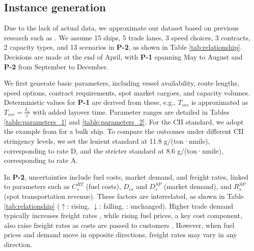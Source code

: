 \documentclass[11pt,english]{article}
\begin{document}
\subsection{Instance generation}
\label{sec:instance}

Due to the lack of actual data, we approximate our dataset based on previous research such as \cite{wang2018planning}. We assume 15 ships, 5 trade lanes, 3 speed choices, 3 contracts, 2 capacity types, and 13 scenarios in \textbf{P-2}, as shown in Table \ref{tab:relationship}. Decisions are made at the end of April, with \textbf{P-1} spanning May to August and \textbf{P-2} from September to December.

We first generate basic parameters, including vessel availability, route lengths, speed options, contract requirements, spot market cargoes, and capacity volumes. Deterministic values for \textbf{P-1} are derived from these, e.g., $T_{vre}$ is approximated as $T_{vre} = \frac{L_r}{e}$ with added layover time. Parameter ranges are detailed in Tables \ref{table:parameters_1} and \ref{table:parameters_2}. For the CII standard, we adopt the example from \cite{IMO_MEPC76_15_Add2_2021} for a bulk ship. To compare the outcomes under different CII stringency levels, we set the lenient standard at 11.8 g/(ton·nmile), corresponding to rate D, and the stricter standard at 8.6 g/(ton·nmile), corresponding to rate A.

In \textbf{P-2}, uncertainties include fuel costs, market demand, and freight rates, linked to parameters such as $C^{RT}_{s}$ (fuel costs), $D_{cs}$ and $D^{SP}_s$ (market demand), and $R^{SP}_s$ (spot transportation revenue). These factors are interrelated, as shown in Table \ref{tab:relationship} ($\uparrow$: rising, $\downarrow$: falling, \textemdash: unchanged). Higher trade demand typically increases freight rates \citep{bai2021tanker,lun2013demand}, while rising fuel prices, a key cost component, also raise freight rates as costs are passed to customers \citep{xu2011dynamics}. However, when fuel prices and demand move in opposite directions, freight rates may vary in any direction.
\end{document}
